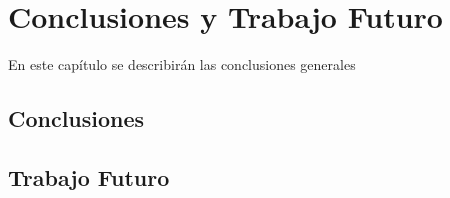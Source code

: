 \chapter{Conclusiones y Trabajo Futuro}
En este capítulo se describirán las conclusiones generales 


\section{Conclusiones}



\section{Trabajo Futuro}



